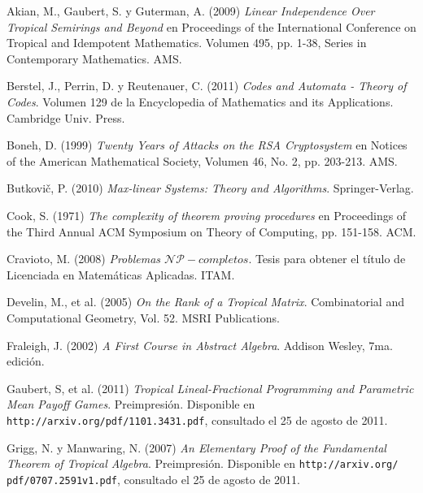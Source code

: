 \documentclass[spanish,12pt,twoside]{book}
\newcommand{\ttt}[1]{\texttt{#1}}
\theoremstyle{definition}
\begin{document}
\backmatter
\renewcommand\refname{Bibliograf\'ia}
\begin{thebibliography}{50}

 		 Akian, M., Gaubert, S. y Guterman, A. (2009) \emph{Linear Independence Over Tropical Semirings and Beyond} en Proceedings of the International Conference on Tropical and Idempotent Mathematics. Volumen 495, pp. 1-38, Series in Contemporary Mathematics. AMS.

     Berstel, J., Perrin, D. y Reutenauer, C. (2011) \emph{Codes and Automata - Theory of Codes}. Volumen 129 de la Encyclopedia of Mathematics and its Applications. Cambridge Univ. Press.
    
 		 Boneh, D. (1999) \emph{Twenty Years of Attacks on the RSA Cryptosystem} en Notices of the American Mathematical Society, Volumen 46, No. 2, pp. 203-213. AMS.%

		 Butkovi\v{c}, P. (2010) \emph{Max-linear Systems: Theory and Algorithms}. Springer-Verlag.%

 		 Cook, S. (1971) \emph{The complexity of theorem proving procedures} en Proceedings of the Third Annual ACM Symposium on Theory of Computing, pp. 151-158. ACM.%

 		 Cravioto, M. (2008) \emph{Problemas $\mathcal{NP}-completos$}. Tesis para obtener el título de Licenciada en Matemáticas Aplicadas. ITAM.

		 Develin, M., et al. (2005) \emph{On the Rank of a Tropical Matrix}. Combinatorial and Computational Geometry, Vol. 52. MSRI Publications.

		 Fraleigh, J. (2002) \emph{A First Course in Abstract Algebra}. Addison Wesley, 7ma. edición.

		 Gaubert, S, et al. (2011) \emph{Tropical Lineal-Fractional Programming and Parametric Mean Payoff Games}. Preimpresión. Disponible en \ttt{http://arxiv.org/pdf/1101.3431.pdf}, consultado el 25 de agosto de 2011.

		 Grigg, N. y Manwaring, N. (2007) \emph{An Elementary Proof of the Fundamental Theorem of Tropical Algebra}. Preimpresión. Disponible en \ttt{http://arxiv.org/ pdf/0707.2591v1.pdf}, consultado el 25 de agosto de 2011.


\end{thebibliography}
\end{document}
